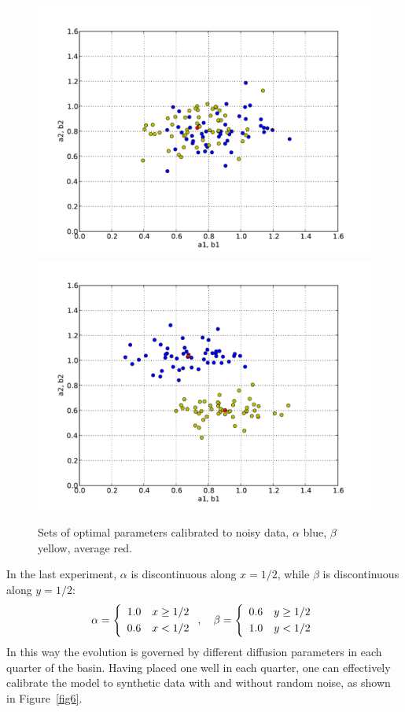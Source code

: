 \begin{figure}
  \centering
  \includegraphics[width=\twofigs]{chapters/schroll/pdf/4Dsample3-5.pdf}
  \includegraphics[width=\twofigs]{chapters/schroll/pdf/4Dsample3b-5.pdf}
  \caption{Sets of optimal parameters calibrated to noisy data, $\alpha$
    blue, $\beta$ yellow, average red.}
  \label{fig7}
\end{figure}

In the last experiment, $\alpha$ is discontinuous along $x=1/2$, while
$\beta$ is discontinuous along $y=1/2$:
\begin{equation}
 \alpha = \left\{
 \begin{array}{rl} 1.0 & x \ge 1/2 \\[\jot] 0.6 & x < 1/2 \end{array}
 \right.
 , \quad
 \beta = \left\{
 \begin{array}{rl} 0.6 & y \ge 1/2 \\[\jot] 1.0 & y < 1/2 \end{array}
 \right.
\end{equation}
In this way the evolution is governed by different diffusion parameters
in each quarter of the basin.  Having placed one well in each quarter,
one can effectively calibrate the model to synthetic data with and
without random noise, as shown in Figure~\ref{fig6}.

